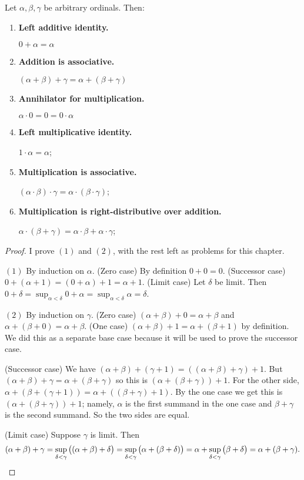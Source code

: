 \documentclass[10pt]{amsart}
\begin{document}
\begin{proposition}
Let $\alpha,\beta,\gamma$ be arbitrary ordinals. Then:
\begin{enumerate}
\item \textbf{Left additive identity.} 

$0 + \alpha = \alpha$
\item \textbf{Addition is associative.} 

$(\alpha + \beta) + \gamma = \alpha + (\beta + \gamma)$ 
\item \textbf{Annihilator for multiplication.}

$\alpha \cdot 0 = 0 = 0 \cdot \alpha$
\item \textbf{Left multiplicative identity.} 

$1 \cdot \alpha = \alpha$;
\item \textbf{Multiplication is associative.} 

$(\alpha \cdot \beta) \cdot \gamma = \alpha \cdot (\beta \cdot \gamma)$;
\item \textbf{Multiplication is right-distributive over addition.} 

$\alpha \cdot (\beta + \gamma) = \alpha \cdot \beta + \alpha \cdot \gamma$;
\end{enumerate}
\end{proposition}

\begin{proof}
I prove $(1)$ and $(2)$, with the rest left as problems for this chapter.

$(1)$ By induction on $\alpha$. (Zero case) By definition $0 + 0 = 0$. (Successor case) $0 + (\alpha + 1) = (0 + \alpha) + 1 = \alpha + 1$. (Limit case) Let $\delta$ be limit. Then $0 + \delta = \sup_{\alpha<\delta} 0 + \alpha = \sup_{\alpha<\delta} \alpha = \delta$.

$(2)$ By induction on $\gamma$. (Zero case) $(\alpha + \beta) + 0 = \alpha + \beta$ and $\alpha + (\beta + 0) = \alpha + \beta$. (One case) $(\alpha + \beta) + 1 = \alpha + (\beta + 1)$ by definition. We did this as a separate base case because it will be used to prove the successor case.

(Successor case) We have $(\alpha + \beta) + (\gamma + 1) = ((\alpha + \beta) + \gamma) + 1$. But $(\alpha + \beta) + \gamma = \alpha + (\beta + \gamma)$ so this is $(\alpha + (\beta + \gamma)) + 1$. For the other side, $\alpha + (\beta + (\gamma + 1)) = \alpha + ((\beta + \gamma) + 1)$. By the one case we get this is $(\alpha + (\beta + \gamma)) + 1$; namely, $\alpha$ is the first summand in the one case and $\beta + \gamma$ is the second summand. So the two sides are equal.

(Limit case) Suppose $\gamma$ is limit. Then 
\[
(\alpha + \beta) + \gamma = \sup_{\delta < \gamma} \big((\alpha + \beta) + \delta\big) = \sup_{\delta < \gamma} \big(\alpha + (\beta + \delta)\big) = \alpha + \sup_{\delta < \gamma}\big( \beta + \delta\big) = \alpha + (\beta + \gamma). \qedhere
\]
\end{proof}
\end{document}
